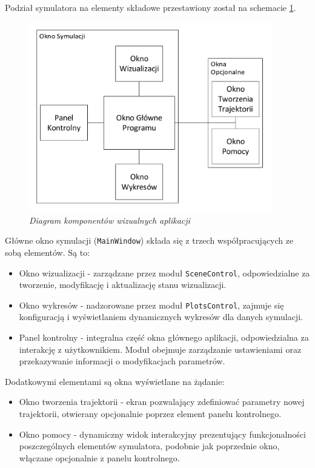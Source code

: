\documentclass[12pt, oneside]{report}
\theoremstyle{definition}
\begin{document}
Podział symulatora na elementy składowe przestawiony został na schemacie \ref{SystemVisual}.

\begin{figure}[H]
	\centering
		\includegraphics[width = 300pt]{SystemVisual} 
		\caption{\textit{Diagram komponentów wizualnych aplikacji}}
		\label{SystemVisual}
\end{figure}

Główne okno symulacji (\texttt{MainWindow}) składa się z trzech współpracujących ze sobą elementów. Są to:
\begin{itemize}
\item Okno wizualizacji - zarządzane przez moduł \texttt{SceneControl}, odpowiedzialne za tworzenie, modyfikację i aktualizację stanu wizualizacji.
\item Okno wykresów - nadzorowane przez moduł \texttt{PlotsControl}, zajmuje się konfiguracją i wyświetlaniem dynamicznych wykresów dla danych symulacji. 
\item Panel kontrolny - integralna część okna głównego aplikacji, odpowiedzialna za interakcję z użytkownikiem. Moduł obejmuje zarządzanie ustawieniami oraz przekazywanie informacji o modyfikacjach parametrów.
\end{itemize}

Dodatkowymi elementami są okna wyświetlane na żądanie:
\begin{itemize}
\item Okno tworzenia trajektorii - ekran pozwalający zdefiniować parametry nowej trajektorii, otwierany opcjonalnie poprzez element panelu kontrolnego.
\item Okno pomocy - dynamiczny widok interakcyjny prezentujący funkcjonalności poszczególnych elementów symulatora, podobnie jak poprzednie okno, włączane opcjonalnie z panelu kontrolnego.
\end{itemize}
\end{document}
